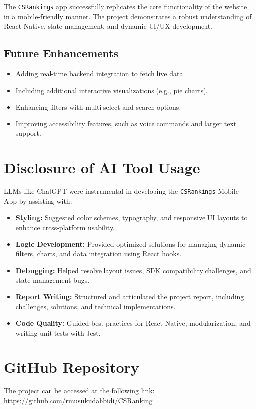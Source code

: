 \documentclass[12pt]{article}
\begin{document}
The \texttt{CSRankings} app successfully replicates the core functionality of the website in a mobile-friendly manner. The project demonstrates a robust understanding of React Native, state management, and dynamic UI/UX development.

\bigskip
\subsection{Future Enhancements}

\begin{itemize}
    \item Adding real-time backend integration to fetch live data.
    \item Including additional interactive visualizations (e.g., pie charts).
    \item Enhancing filters with multi-select and search options.
    \item Improving accessibility features, such as voice commands and larger text support.
\end{itemize}

\section{Disclosure of AI Tool Usage}

LLMs like ChatGPT were instrumental in developing the \texttt{CSRankings} Mobile App by assisting with:

\begin{itemize}
    \item \textbf{Styling:} Suggested color schemes, typography, and responsive UI layouts to enhance cross-platform usability.
    \item \textbf{Logic Development:} Provided optimized solutions for managing dynamic filters, charts, and data integration using React hooks.
    \item \textbf{Debugging:} Helped resolve layout issues, SDK compatibility challenges, and state management bugs.
    \item \textbf{Report Writing:} Structured and articulated the project report, including challenges, solutions, and technical implementations.
    \item \textbf{Code Quality:} Guided best practices for React Native, modularization, and writing unit tests with Jest.
\end{itemize}

\section{GitHub Repository}

The project can be accessed at the following link: \url{https://github.com/rmusukudabbidi/CSRanking}







 
 
\end{document}
